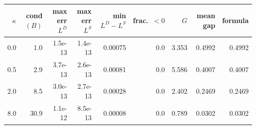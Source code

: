 \begin{tabular}{rrrrrrrrr}
\toprule
$\kappa$ & cond$(B)$ & max err $L^D$ & max err $L^S$ & min $L^D\!-\!L^S$ & frac.\ $<0$ & $G$ & mean gap & formula \\
\midrule
0.0 & 1.0 & 1.5e-13 & 1.4e-13 & 0.00075 & 0.0 & 3.353 & 0.4992 & 0.4992 \\
0.5 & 2.9 & 3.7e-13 & 2.6e-13 & 0.00081 & 0.0 & 5.586 & 0.4007 & 0.4007 \\
2.0 & 8.5 & 3.0e-13 & 2.7e-13 & 0.00028 & 0.0 & 2.402 & 0.2469 & 0.2469 \\
8.0 & 30.9 & 1.1e-12 & 8.5e-13 & 0.00008 & 0.0 & 0.789 & 0.0302 & 0.0302 \\
\bottomrule
\end{tabular}
